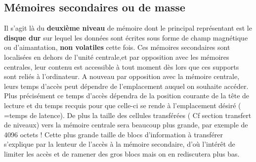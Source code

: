 \documentclass{report}
\begin{document}
\subsection{Mémoires secondaires ou de masse}
Il s'agit là du {\bf deuxième niveau} de mémoire dont le principal représentant est le {\bf disque dur} sur lequel les données sont écrites sous forme de champ magnétique ou d'aimantation, {\bf non volatiles} cette fois. Ces mémoires secondaires sont localisées en dehors de l'unité centrale,et par opposition avec les mémoires centrales, leur contenu est accessible à tout moment dès lors que ces supports sont reliés à l'ordinateur. A nouveau par opposition avec la mémoire centrale, leurs temps d'accès peut dépendre de l'emplacement auquel on souhaite accéder. Plus précisément ce temps d'accès dépendra de la position courante de la tête de lecture et du temps recquis pour que celle-ci se rende à l'emplacement désiré ( =temps de latence). De plus la taille des cellules transférées ( Cf section transfert de niveaux) vers la mémoire centrale sera beaucoup plus grande, par exemple de 4096 octets ! Cette plus grande taille de blocs d'information à transférer s'explique par la lenteur de l'accès à la mémoire secondaire, d'où l'intérêt de limiter les accès et de ramener des gros blocs mais on en rediscutera plus bas.\\
\end{document}

